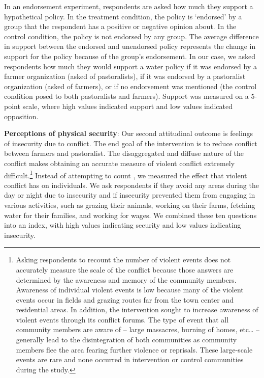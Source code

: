 \documentclass[11pt]{article}
\begin{document}
In an endorsement experiment, respondents are asked how much they
support a hypothetical policy. In the treatment condition, the policy is
`endorsed' by a group that the respondent has a positive or negative
opinion about. In the control condition, the policy is not endorsed by
any group. The average difference in support between the endorsed and
unendorsed policy represents the change in support for the policy
because of the group's endorsement. In our case, we asked respondents
how much they would support a water policy if it was endorsed by a
farmer organization (asked of pastoralists), if it was endorsed by a
pastoralist organization (asked of farmers), or if no endorsement was
mentioned (the control condition posed to both pastoralists and
farmers). Support was measured on a 5-point scale, where high values
indicated support and low values indicated opposition.

\textbf{Perceptions of physical security}: Our second attitudinal
outcome is feelings of insecurity due to conflict. The end goal of the
intervention is to reduce conflict between farmers and pastoralist. The
disaggregated and diffuse nature of the conflict makes obtaining an
accurate measure of violent conflict extremely difficult.\footnote{Asking
  respondents to recount the number of violent events does not
  accurately measure the scale of the conflict because those answers are
  determined by the awareness and memory of the community members.
  Awareness of individual violent events is low because many of the
  violent events occur in fields and grazing routes far from the town
  center and residential areas. In addition, the intervention sought to
  increase awareness of violent events through its conflict forums. The
  type of event that all community members are aware of -- large
  massacres, burning of homes, etc\ldots{} -- generally lead to the
  disintegration of both communities as community members flee the area
  fearing further violence or reprisals. These large-scale events are
  rare and none occurred in intervention or control communities during
  the study.} Instead of attempting to count , we measured the effect
that violent conflict has on individuals. We ask respondents if they
avoid any areas during the day or night due to insecurity and if
insecurity prevented them from engaging in various activities, such as
grazing their animals, working on their farms, fetching water for their
families, and working for wages. We combined these ten questions into an
index, with high values indicating security and low values indicating
insecurity.
\end{document}

